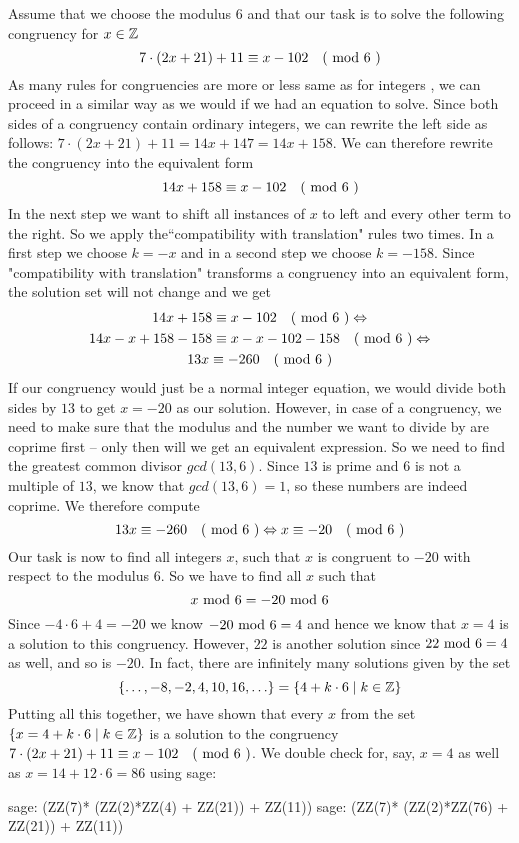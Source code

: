 \begin{example}
\label{example_first_congruency}
Assume that we choose the modulus $6$ and that our task is to solve the following congruency for $x\in \mathbb{Z}$
$$7\cdot(2x+21) + 11 \equiv x-102 \quad \text{( mod } 6 \text{ )}$$
As many rules for congruencies are more or less same as for integers , we can proceed in a  similar way as we would if we had an equation to solve. 
Since both sides of a congruency contain ordinary integers, we can rewrite the left side as follows: $7\cdot(2x+21) + 11 = 14x + 147 = 14x +158$. We can therefore rewrite the congruency into the equivalent form
$$14x +158 \equiv x-102 \quad \text{( mod } 6 \text{ )}$$
In the next step we want to shift all instances of $x$ to left and every other term to the right. So we apply the``compatibility with translation" rules two times. In a first step we choose $k=-x$ and in a second step we choose $k=-158$. Since "compatibility with translation" transforms a congruency into an equivalent form, the solution set will not change and we get 
\begin{multline*}
14x +158 \equiv x-102 \quad \text{( mod } 6 \text{ )} \Leftrightarrow\\
14x-x +158-158 \equiv x-x-102-158 \quad \text{( mod } 6 \text{ )} \Leftrightarrow \\
13x \equiv -260 \quad \text{( mod } 6 \text{ )}
\end{multline*}
If our congruency would just be a normal integer equation, we would divide both sides by $13$ to get $x=-20$ as our solution. However, in case of a congruency, we need to make sure that the modulus and the number we want to divide by are coprime first – only then will we get an equivalent expression. So we need to find the greatest common divisor $gcd(13,6)$. Since $13$ is prime and $6$ is not a multiple of $13$, we know that $gcd(13,6)=1$, so these numbers are indeed coprime. We therefore compute 
$$
13x \equiv -260 \quad \text{( mod } 6 \text{ )} \Leftrightarrow x \equiv -20 \quad \text{( mod } 6 \text{ )}
$$
Our task is now to find all integers $x$, such that $x$ is congruent to $-20$ with respect to the modulus $6$. So we have to find all $x$ such that
$$
x \text{ mod } 6 = -20 \text{ mod } 6
$$
Since $-4\cdot 6 +4 = -20$ we know $ -20 \text{ mod } 6 = 4$ and hence we know that $x=4$ is a solution to this congruency. However, $22$ is another solution since $ 22 \text{ mod } 6 = 4$ as well, and so is $-20$. In fact, there are infinitely many solutions given by the set
$$
\{\ldots, -8,-2, 4,10, 16,\ldots\} = \{4+k\cdot 6 \;|\; k\in \mathbb{Z}\}
$$
Putting all this together, we have shown that every $x$ from the set $\{x=4+k\cdot 6 \;|\; k\in \mathbb{Z}\}$ is a solution to the congruency $7\cdot(2x+21) + 11 \equiv x-102 \quad \text{( mod } 6 \text{ )}$. We double check for, say, $x=4$ as well as $x=14 + 12\cdot 6 = 86$ using sage:
\begin{sagecommandline}
sage: (ZZ(7)* (ZZ(2)*ZZ(4) + ZZ(21)) + ZZ(11))  %
sage: (ZZ(7)* (ZZ(2)*ZZ(76) + ZZ(21)) + ZZ(11))  %
\end{sagecommandline}
\end{example}
